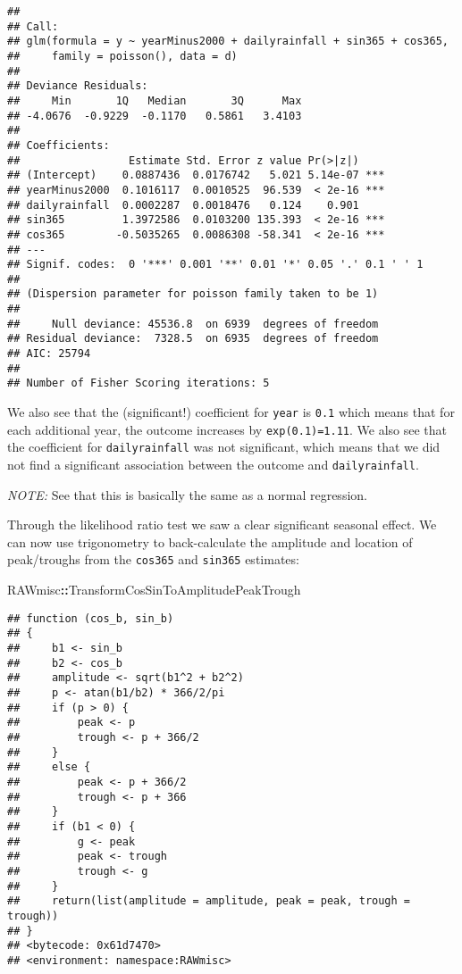 \documentclass[]{book}
\newenvironment{Shaded}{\begin{snugshade}}{\end{snugshade}}
\newcommand{\OperatorTok}[1]{\textcolor[rgb]{0.81,0.36,0.00}{\textbf{#1}}}
\newcommand{\NormalTok}[1]{#1}
\begin{document}
\begin{verbatim}
## 
## Call:
## glm(formula = y ~ yearMinus2000 + dailyrainfall + sin365 + cos365, 
##     family = poisson(), data = d)
## 
## Deviance Residuals: 
##     Min       1Q   Median       3Q      Max  
## -4.0676  -0.9229  -0.1170   0.5861   3.4103  
## 
## Coefficients:
##                 Estimate Std. Error z value Pr(>|z|)    
## (Intercept)    0.0887436  0.0176742   5.021 5.14e-07 ***
## yearMinus2000  0.1016117  0.0010525  96.539  < 2e-16 ***
## dailyrainfall  0.0002287  0.0018476   0.124    0.901    
## sin365         1.3972586  0.0103200 135.393  < 2e-16 ***
## cos365        -0.5035265  0.0086308 -58.341  < 2e-16 ***
## ---
## Signif. codes:  0 '***' 0.001 '**' 0.01 '*' 0.05 '.' 0.1 ' ' 1
## 
## (Dispersion parameter for poisson family taken to be 1)
## 
##     Null deviance: 45536.8  on 6939  degrees of freedom
## Residual deviance:  7328.5  on 6935  degrees of freedom
## AIC: 25794
## 
## Number of Fisher Scoring iterations: 5
\end{verbatim}

We also see that the (significant!) coefficient for \texttt{year} is
\texttt{0.1} which means that for each additional year, the outcome
increases by \texttt{exp(0.1)=1.11}. We also see that the coefficient
for \texttt{dailyrainfall} was not significant, which means that we did
not find a significant association between the outcome and
\texttt{dailyrainfall}.

\emph{NOTE:} See that this is basically the same as a normal regression.

Through the likelihood ratio test we saw a clear significant seasonal
effect. We can now use trigonometry to back-calculate the amplitude and
location of peak/troughs from the \texttt{cos365} and \texttt{sin365}
estimates:

\begin{Shaded}
\begin{Highlighting}[]
\NormalTok{RAWmisc}\OperatorTok{::}\NormalTok{TransformCosSinToAmplitudePeakTrough}
\end{Highlighting}
\end{Shaded}

\begin{verbatim}
## function (cos_b, sin_b) 
## {
##     b1 <- sin_b
##     b2 <- cos_b
##     amplitude <- sqrt(b1^2 + b2^2)
##     p <- atan(b1/b2) * 366/2/pi
##     if (p > 0) {
##         peak <- p
##         trough <- p + 366/2
##     }
##     else {
##         peak <- p + 366/2
##         trough <- p + 366
##     }
##     if (b1 < 0) {
##         g <- peak
##         peak <- trough
##         trough <- g
##     }
##     return(list(amplitude = amplitude, peak = peak, trough = trough))
## }
## <bytecode: 0x61d7470>
## <environment: namespace:RAWmisc>
\end{verbatim}
\end{document}

